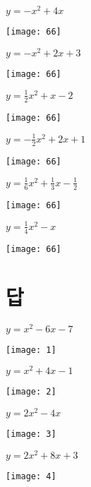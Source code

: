 \documentclass[a4paper]{oblivoir}
\let\oldsection\section
\renewcommand\section{\clearpage\oldsection}
\begin{document}
\clearpage
\begin{minipage}{0.45\textwidth}\centering
\(y=-x^2+4x\)
\par\bigskip\texttt{[image: 66]}
\end{minipage}
\begin{minipage}{0.45\textwidth}\centering
\(y=-x^2+2x+3\)
\par\bigskip\texttt{[image: 66]}
\end{minipage}\bigskip\bigskip\par
\begin{minipage}{0.45\textwidth}\centering
\(y=\frac12x^2+x-2\)
\par\bigskip\texttt{[image: 66]}
\end{minipage}
\begin{minipage}{0.45\textwidth}\centering
\(y=-\frac12x^2+2x+1\)
\par\bigskip\texttt{[image: 66]}
\end{minipage}\bigskip\bigskip\par
\begin{minipage}{0.45\textwidth}\centering
\(y=\frac16x^2+\frac13x-\frac12\)
\par\bigskip\texttt{[image: 66]}
\end{minipage}
\begin{minipage}{0.45\textwidth}\centering
\(y=\frac14x^2-x\)
\par\bigskip\texttt{[image: 66]}
\end{minipage}\bigskip\bigskip\par


\section*{답}
\begin{minipage}{0.45\textwidth}\centering
\(y=x^2-6x-7\)
\par\bigskip\texttt{[image: 1]}
\end{minipage}
\begin{minipage}{0.45\textwidth}\centering
\(y=x^2+4x-1\)
\par\bigskip\texttt{[image: 2]}
\end{minipage}\bigskip\bigskip\par
\begin{minipage}{0.45\textwidth}\centering
\(y=2x^2-4x\)
\par\bigskip\texttt{[image: 3]}
\end{minipage}
\begin{minipage}{0.45\textwidth}\centering
\(y=2x^2+8x+3\)
\par\bigskip\texttt{[image: 4]}
\end{minipage}\bigskip\bigskip\par
\end{document}
